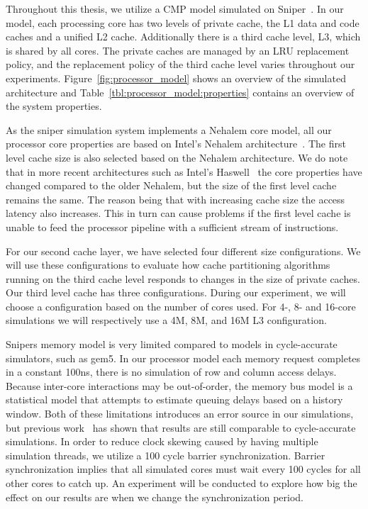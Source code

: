 Throughout this thesis, we utilize a CMP model simulated on Sniper~\cite{Carlson2011a}. 
In our model, each processing core has two levels of private cache, the L1 data and code caches and a unified L2 cache.
Additionally there is a third cache level, L3, which is shared by all cores. 
The private caches are managed by an LRU replacement policy, and the replacement policy of the third cache level varies throughout our experiments.
Figure~\ref{fig:processor_model} shows an overview of the simulated architecture and Table~\ref{tbl:processor_model:properties} contains an overview of the system properties.

As the sniper simulation system implements a Nehalem core model, all our processor core properties are based on Intel's Nehalem architecture~\cite{Thomadakis2011}. 
The first level cache size is also selected based on the Nehalem architecture. 
We do note that in more recent architectures such as Intel's Haswell~\cite{Jain2013} the core properties have changed compared to the older Nehalem, but the size of the first level cache remains the same.
The reason being that with increasing cache size the access latency also increases. 
This in turn can cause problems if the first level cache is unable to feed the processor pipeline with a sufficient stream of instructions.

For our second cache layer, we have selected four different size configurations.
We will use these configurations to evaluate how cache partitioning algorithms running on the third cache level responds to changes in the size of private caches.
Our third level cache has three configurations.
During our experiment, we will choose a configuration based on the number of cores used.
For 4-, 8- and 16-core simulations we will respectively use a 4M, 8M, and 16M L3 configuration.

Snipers memory model is very limited compared to models in cycle-accurate simulators, such as gem5.
In our processor model each memory request completes in a constant 100ns, there is no simulation of row and column access delays.
Because inter-core interactions may be out-of-order, the memory bus model is a statistical model that attempts to estimate queuing delays based on a history window.
Both of these limitations introduces an error source in our simulations, but previous work~\cite{Carlson2011a, Olsen2014} has shown that results are still comparable to cycle-accurate simulations.
In order to reduce clock skewing caused by having multiple simulation threads, we utilize a 100 cycle barrier synchronization.
Barrier synchronization implies that all simulated cores must wait every 100 cycles for all other cores to catch up.
An experiment will be conducted to explore how big the effect on our results are when we change the synchronization period.

